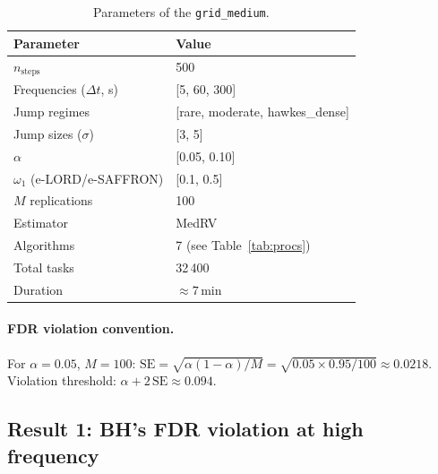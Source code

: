 \documentclass[11pt,a4paper]{article}
\theoremstyle{plain}
\theoremstyle{definition}
\theoremstyle{remark}
\begin{document}
\begin{table}[H]
\centering
\caption{Parameters of the \texttt{grid\_medium}.}
\label{tab:grid}
\begin{tabular}{ll}
\toprule
Parameter & Value \\
\midrule
$n_\text{steps}$ & 500 \\
Frequencies ($\Delta t$, s) & [5, 60, 300] \\
Jump regimes & [rare, moderate, hawkes\_dense] \\
Jump sizes ($\sigma$) & [3, 5] \\
$\alpha$ & [0.05, 0.10] \\
$\omega_1$ (e-LORD/e-SAFFRON) & [0.1, 0.5] \\
$M$ replications & 100 \\
Estimator & MedRV \\
Algorithms & 7 (see Table~\ref{tab:procs}) \\
Total tasks & 32\,400 \\
Duration & $\approx 7\,\mathrm{min}$ \\
\bottomrule
\end{tabular}
\end{table}

\paragraph{FDR violation convention.}
For $\alpha = 0.05$, $M = 100$:
$\mathrm{SE} = \sqrt{\alpha(1-\alpha)/M} = \sqrt{0.05 \times 0.95/100} \approx 0.0218$.
Violation threshold: $\alpha + 2\,\mathrm{SE} \approx 0.094$.

\subsection{Result 1: BH's FDR violation at high frequency}
\end{document}
